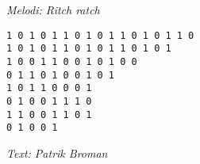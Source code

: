 {\footnotesize\textit{Melodi: Ritch ratch}}\par
\vspace{10pt}
\texttt{1 0 1 0 1 1 0 1 0 1 1 0 1 0 1 1 0\\
1 0 1 0 1 1 0 1 0 1 1 0 1 0 1\\
1 0 0 1 1 0 0 1 0 1 0 0\\
0 1 1 0 1 0 0 1 0 1\\
1 0 1 1 0 0 0 1\\
0 1 0 0 1 1 1 0\\
1 1 0 0 1 1 0 1\\
0 1 0 0 1}\par
\vspace{10pt}
{\footnotesize\textit{Text: Patrik Broman}}
